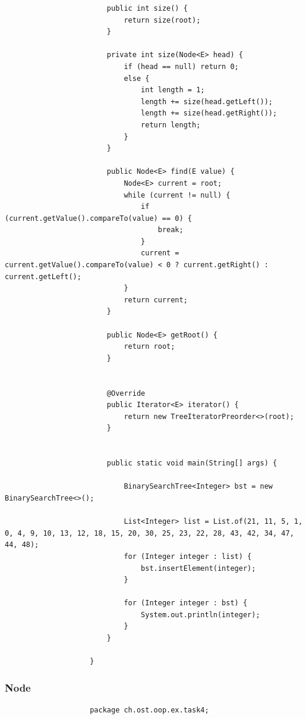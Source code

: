 \documentclass[a4paper, landscape, 8pt]{scrartcl}
\begin{document}
\begin{multicols*}{4}
\begin{lstlisting}
                        public int size() {
                            return size(root);
                        }

                        private int size(Node<E> head) {
                            if (head == null) return 0;
                            else {
                                int length = 1;
                                length += size(head.getLeft());
                                length += size(head.getRight());
                                return length;
                            }
                        }

                        public Node<E> find(E value) {
                            Node<E> current = root;
                            while (current != null) {
                                if (current.getValue().compareTo(value) == 0) {
                                    break;
                                }
                                current = current.getValue().compareTo(value) < 0 ? current.getRight() : current.getLeft();
                            }
                            return current;
                        }

                        public Node<E> getRoot() {
                            return root;
                        }


                        @Override
                        public Iterator<E> iterator() {
                            return new TreeIteratorPreorder<>(root);
                        }


                        public static void main(String[] args) {

                            BinarySearchTree<Integer> bst = new BinarySearchTree<>();

                            List<Integer> list = List.of(21, 11, 5, 1, 0, 4, 9, 10, 13, 12, 18, 15, 20, 30, 25, 23, 22, 28, 43, 42, 34, 47, 44, 48);
                            for (Integer integer : list) {
                                bst.insertElement(integer);
                            }

                            for (Integer integer : bst) {
                                System.out.println(integer);
                            }
                        }

                    }
                \end{lstlisting}

                \subsubsection{Node}
                    \begin{lstlisting}
                    package ch.ost.oop.ex.task4;


\end{lstlisting}
\end{multicols*}
\end{document}

